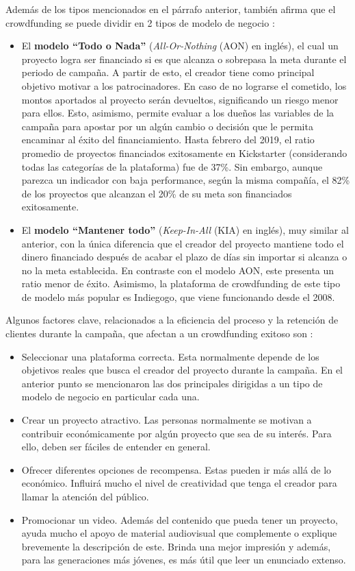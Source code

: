 Además de los tipos mencionados en el párrafo anterior, \citeauthor{cr_collins2014crwd} también afirma que el crowdfunding se puede dividir en 2 tipos de modelo de negocio \parencite{cr_lee2019crwdfactors}:
\begin{itemize}
	\item El \textbf{modelo “Todo o Nada”} (\textit{All-Or-Nothing} (AON) en inglés), el cual un proyecto logra ser financiado si es que alcanza o sobrepasa la meta durante el periodo de campaña. A partir de esto, el creador tiene como principal objetivo motivar a los patrocinadores. En caso de no lograrse el cometido, los montos aportados al proyecto serán devueltos, significando un riesgo menor para ellos. Esto, asimismo, permite evaluar a los dueños las variables de la campaña para apostar por un algún cambio o decisión que le permita encaminar al éxito del financiamiento. Hasta febrero del 2019, el ratio promedio de proyectos financiados exitosamente en Kickstarter (considerando todas las categorías de la plataforma) fue de 37\%. Sin embargo, aunque parezca un indicador con baja performance, según la misma compañía, el 82\% de los proyectos que alcanzan el 20\% de su meta son financiados exitosamente. 
	\item El \textbf{modelo “Mantener todo”} (\textit{Keep-In-All} (KIA) en inglés), muy similar al anterior, con la única diferencia que el creador del proyecto mantiene todo el dinero financiado después de acabar el plazo de días sin importar si alcanza o no la meta establecida. En contraste con el modelo AON, este presenta un ratio menor de éxito. Asimismo, la plataforma de crowdfunding de este tipo de modelo más popular es Indiegogo, que viene funcionando desde el 2008.
\end{itemize}

Algunos factores clave, relacionados a la eficiencia del proceso y la retención de clientes durante la campaña, que afectan a un crowdfunding exitoso son \parencite{cr_lee2019crwdfactors}:
\begin{itemize}
	\item Seleccionar una plataforma correcta. Esta normalmente depende de los objetivos reales que busca el creador del proyecto durante la campaña. En el anterior punto se mencionaron las dos principales dirigidas a un tipo de modelo de negocio en particular cada una.
	\item Crear un proyecto atractivo. Las personas normalmente se motivan a contribuir económicamente por algún proyecto que sea de su interés. Para ello, deben ser fáciles de entender en general.
	\item Ofrecer diferentes opciones de recompensa. Estas pueden ir más allá de lo económico. Influirá mucho el nivel de creatividad que tenga el creador para llamar la atención del público.
	\item Promocionar un video. Además del contenido que pueda tener un proyecto, ayuda mucho el apoyo de material audiovisual que complemente o explique brevemente la descripción de este. Brinda una mejor impresión y además, para las generaciones más jóvenes, es más útil que leer un enunciado extenso.
\end{itemize}

